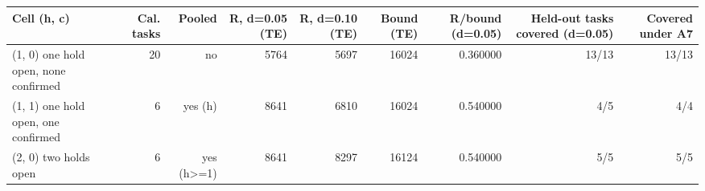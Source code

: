 \begin{tabular}{lrrrrrrrr}
\toprule
Cell (h, c) & Cal. tasks & Pooled & R, d=0.05 (TE) & R, d=0.10 (TE) & Bound (TE) & R/bound (d=0.05) & Held-out tasks covered (d=0.05) & Covered under A7 \\
\midrule
(1, 0) one hold open, none confirmed & 20 & no & 5764 & 5697 & 16024 & 0.360000 & 13/13 & 13/13 \\
(1, 1) one hold open, one confirmed & 6 & yes (h) & 8641 & 6810 & 16024 & 0.540000 & 4/5 & 4/4 \\
(2, 0) two holds open & 6 & yes (h>=1) & 8641 & 8297 & 16124 & 0.540000 & 5/5 & 5/5 \\
\bottomrule
\end{tabular}
